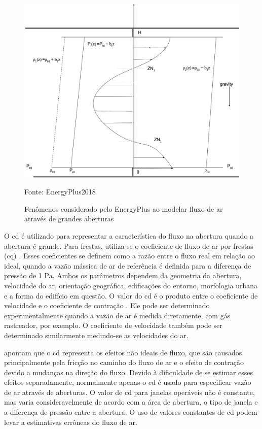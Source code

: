 \documentclass[brazil,hardcopy,openany]{ufscthesis} %
\newcommand{\source}[1]{\small \caption*{Fonte: {#1}} } %
\newcommand{\figsize}{.6}
\begin{document}
\begin{figure}[h]
	\centering
	\caption{Fenômenos considerado pelo EnergyPlus ao modelar fluxo de ar através de grandes aberturas}
	\includegraphics[width=\figsize\linewidth]{img/detailed_opening.png}
	\label{fig:DetailedOpening}
	\source{EnergyPlus2018}
\end{figure}

O \acrfull{cd} é utilizado para representar a característica do fluxo na abertura quando a abertura é grande. Para frestas, utiliza-se o coeficiente de fluxo de ar por frestas (\acrshort{cq}) \cite{Arendt2017}.
Esses coeficientes se definem como a razão entre o fluxo real em relação ao	ideal, quando a vazão mássica de ar de referência é definida para a diferença de pressão de 1 Pa. Ambos os parâmetros dependem da geometria da abertura, velocidade do ar, orientação geográfica, edificações do entorno, morfologia urbana e a forma do edifício em questão.
O valor do \acrshort{cd} é o produto entre o coeficiente de velocidade e o coeficiente de contração \cite{Flourentzou1998}. Ele pode ser determinado experimentalmente quando a vazão de ar é medida diretamente, com gás rastreador, por exemplo. O coeficiente de velocidade também pode ser determinado similarmente medindo-se as velocidades do ar.

 apontam que o \acrshort{cd} representa os efeitos não ideais de fluxo, que são causados principalmente pela fricção no caminho do fluxo de ar e o efeito de contração devido a mudanças na direção do fluxo. Devido à dificuldade de se estimar esses efeitos separadamente, normalmente apenas o \acrshort{cd} é usado para especificar vazão de ar através de aberturas. O valor de \acrshort{cd} para janelas operáveis não é constante, mas varia consideravelmente de acordo com a área de abertura, o tipo de janela e a diferença de pressão entre a abertura. O uso de valores constantes de \acrshort{cd} podem levar a estimativas errôneas do fluxo de ar.
\end{document}
